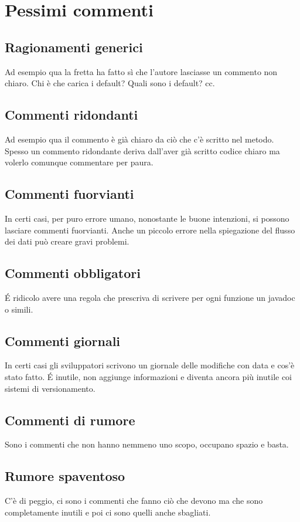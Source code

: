 \documentclass[11pt,a4paper]{book}
\begin{document}
\section{Pessimi commenti}
\subsection{Ragionamenti generici}
\label{code: 032}
Ad esempio qua la fretta ha fatto sì che l'autore lasciasse un commento non chiaro. Chi è che carica i default? Quali sono i default? cc.

\subsection{Commenti ridondanti}
\label{code: 033}
Ad esempio qua il commento è già chiaro da ciò che c'è scritto nel metodo. Spesso un commento ridondante deriva dall'aver già scritto codice chiaro ma volerlo comunque commentare per paura.

\subsection{Commenti fuorvianti}
In certi casi, per puro errore umano, nonostante le buone intenzioni, si possono lasciare commenti fuorvianti. Anche un piccolo errore nella spiegazione del flusso dei dati può creare gravi problemi.

\subsection{Commenti obbligatori}
É ridicolo avere una regola che prescriva di scrivere per ogni funzione un javadoc o simili. 

\subsection{Commenti giornali}
In certi casi gli sviluppatori scrivono un giornale delle modifiche con data e cos'è stato fatto. É inutile, non aggiunge informazioni e diventa ancora più inutile coi sistemi di versionamento.

\subsection{Commenti di rumore}
Sono i commenti che non hanno nemmeno uno scopo, occupano spazio e basta.

\subsection{Rumore spaventoso}
C'è di peggio, ci sono i commenti che fanno ciò che devono ma che sono completamente inutili e poi ci sono quelli anche sbagliati.
\end{document}
